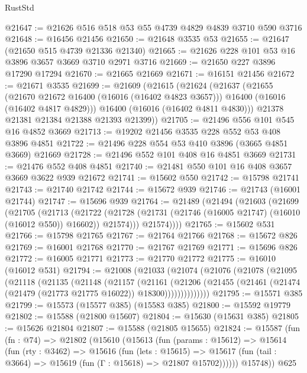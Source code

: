 \begin{lexlean}{RustStd}
\begin{coremodule}
@21647 := @21626 @516 @518 @53 @55 @4739 @4829 @4839 @3710 @590 @3716
@21648 := @16456 @21456
@21650 := @21648 @3535 @53
@21655 := @21647 (@21650 @515 @4739 @21336 @21340)
@21665 := @21626 @228 @101 @53 @16 @3896 @3657 @3669 @3710 @2971 @3716
@21669 := @21650 @227 @3896 @17290 @17294
@21670 := @21665 @21669
@21671 := @16151 @21456
@21672 := @21671 @3535
@21699 := @21609
    (@21615
      (@21624
        (@21637
          (@21655
            (@21670 @21672 @16400 (@16016 (@16402 @4823 @3657)))
            @16400
            (@16016 (@16402 @4817 @4829)))
          @16400
          (@16016 (@16402 @4811 @4830)))
        @21378
        @21381
        @21384
        @21388
        @21393
        @21399))
@21705 := @21496 @556 @101 @545 @16 @4852 @3669
@21713 := @19202 @21456 @3535 @228 @552 @53 @408 @3896 @4851
@21722 := @21496 @228 @554 @53 @410 @3896 (@3665 @4851 @3669) @21669
@21728 := @21496 @552 @101 @408 @16 @4851 @3669
@21731 := @21476 @552 @408 @4851
@21740 := @21481 @550 @101 @16 @408 @3657 @3669 @3622 @939 @21672
@21741 := @15602 @550
@21742 := @15798 @21741
@21743 := @21740 @21742
@21744 := @15672 @939
@21746 := @21743 (@16001 @21744)
@21747 := @15696 @939
@21764 := @21489
    (@21494
      (@21603
        (@21699
          (@21705
            (@21713
              (@21722
                (@21728 (@21731 (@21746 (@16005 @21747) (@16010 (@16012 @550)) @16602)) @21574)))
            @21574))))
@21765 := @15602 @531
@21766 := @15798 @21765
@21767 := @21764 @21766
@21768 := @15672 @826
@21769 := @16001 @21768
@21770 := @21767 @21769
@21771 := @15696 @826
@21772 := @16005 @21771
@21773 := @21770 @21772
@21775 := @16010 (@16012 @531)
@21794 := @21008
    (@21033
      (@21074
        (@21076
          (@21078
            (@21095
              (@21118
                (@21135
                  (@21148
                    (@21157
                      (@21161
                        (@21206
                          (@21455
                            (@21461 (@21474 (@21479 (@21773 @21775 @16022)) @18300))))))))))))))
@21795 := @15571 @385
@21799 := @15573 (@15577 @385) (@15583 @385)
@21800 := @15592 @19779
@21802 := @15588 (@21800 @15607)
@21804 := @15630 (@15631 @385)
@21805 := @15626 @21804
@21807 := @15588 (@21805 @15655)
@21824 := @15587
    (fun (fn : @74) =>
    @21802
      (@15610
        (@15613
          (fun (params : @15612) =>
          @15614
            (fun (rty : @3462) =>
            @15616
              (fun (lets : @15615) =>
              @15617 (fun (tail : @3664) => @15619 (fun (Γ : @15618) => @21807 @15702))))))
        @15748))
    @625

\end{coremodule}
\end{lexlean}
